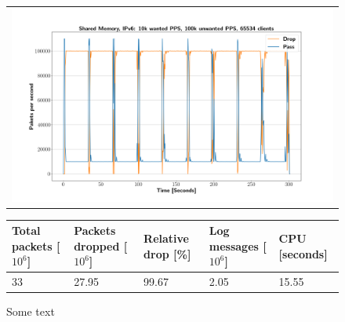 \begin{figure}[p]
	\label{fig:simplefail2ban:shm:ip6:100k}
	\centering
	\scriptsize
	\begin{tabular}{c}
    	\centerline{\includegraphics[width=1.2\textwidth]{images/simplefail2ban_shm_ipv6_v10k_iv100k_c65534.png}}
	\end{tabular}
	\begin{tabular}{lllll}
		\toprule
		\textbf{Total packets [$10^6$]} & \textbf{Packets dropped [$10^6$]} & \textbf{Relative drop [\%]} & \textbf{Log messages [$10^6$]} & \textbf{CPU [seconds]} \\ \midrule 
		33 & 27.95 & 99.67 & 2.05 & 15.55 \\
		\bottomrule
	\end{tabular}
	\caption[Simplefail2ban, Shared Memory, IPv6, 100k \ac{PPS}]{Some text}
\end{figure}

